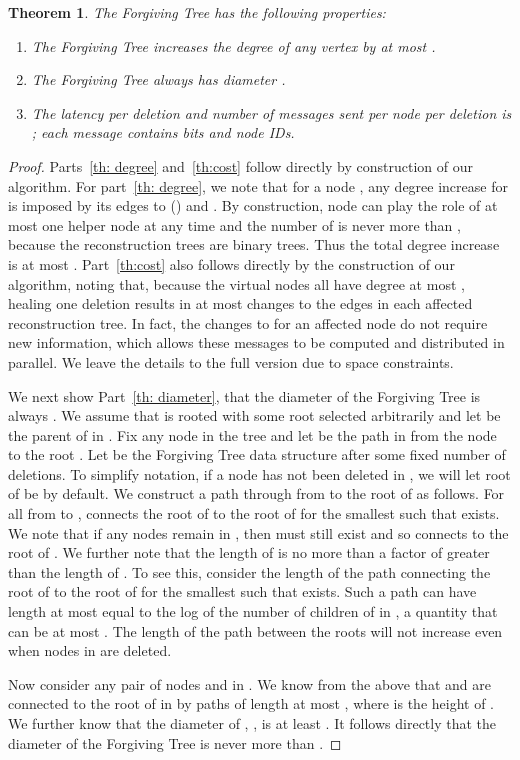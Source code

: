 \documentclass[11pt]{article}
\newtheorem{theorem}{Theorem}
\begin{document}
\begin{theorem}
The Forgiving Tree has the following properties:
\label{theorem: forgiving}
\begin{enumerate}
\item\label{th: degree} 
  The Forgiving Tree increases the degree of any vertex by at most .
\item\label{th: diameter} 
  The Forgiving Tree always has diameter .
\item \label{th:cost} 
  The latency per deletion and number of messages sent per node per 
  deletion is ; each message contains  bits and node IDs.
\end{enumerate}
\end{theorem}
\begin{proof}
 Parts~\ref{th: degree} and~\ref{th:cost} follow directly by
construction of our algorithm.  For part~\ref{th: degree}, we note
that for a node , any degree increase for  is imposed by its
edges to () and . By construction, node
 can play the role of at most one helper node at any time and the
number of  is never more than , because the
reconstruction trees are binary trees.  Thus the total degree increase
is at most .  Part~\ref{th:cost} also follows directly by the
construction of our algorithm, noting that, because the virtual nodes all have degree at most , healing one deletion 
results in at most  changes to the edges in each 
affected reconstruction tree.  In fact, the changes to 
 for an affected node  do not require new information,
which allows these messages to be computed and distributed in parallel.
We leave the details to the full version due to space constraints.


We next show Part~\ref{th: diameter}, that the diameter of the
Forgiving Tree is always .  We assume that  is
rooted with some root  selected arbitrarily and let  be the
parent of  in .  Fix any node  in the tree and let  be the path in  from the node  to the
root .  Let  be the Forgiving Tree data structure
after some fixed number of deletions.  To simplify notation, if a node
 has not been deleted in , we will let root of  be 
by default.  We construct a path  through  from  to the
root of  as follows.  For all  from  to , 
connects the root of  to the root of  for
the smallest  such that  exists.  We note that
if any nodes remain in , then  must still exist and so
 connects  to the root of .  We further note that
the length of  is no more than a factor of 
greater than the length of .  To see this, consider the length of
the path connecting the root of  to the root of
 for the smallest  such that 
exists.  Such a path can have length at most equal to the log of the
number of children of  in , a quantity that can be at most
.  The length of the path between the roots will not
increase even when nodes in  are deleted.

Now consider any pair of nodes  and  in .  We know from the
above that  and  are connected to the root of  in 
by paths of length at most , where  is
the height of .  We further know that the diameter of , , is
at least .  It follows directly that the diameter of the Forgiving
Tree is never more than .
\end{proof}
\end{document}
